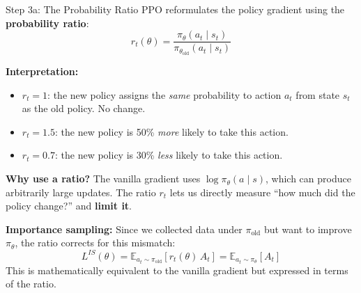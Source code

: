 \documentclass[aspectratio=169,11pt]{beamer}
\begin{document}
\begin{frame}{Step 3a: The Probability Ratio}
  \small
  PPO reformulates the policy gradient using the \textbf{probability ratio}:
  \[
    r_t(\theta) = \frac{\pi_\theta(a_t \mid s_t)}{\pi_{\theta_\text{old}}(a_t \mid s_t)}
  \]

  \textbf{Interpretation:}
  \begin{itemize}\setlength\itemsep{2pt}
    \item $r_t = 1$: the new policy assigns the \emph{same} probability to action $a_t$
      from state $s_t$ as the old policy. No change.
    \item $r_t = 1.5$: the new policy is 50\% \emph{more} likely to take this action.
    \item $r_t = 0.7$: the new policy is 30\% \emph{less} likely to take this action.
  \end{itemize}

  \medskip
  \textbf{Why use a ratio?}  The vanilla gradient uses $\log \pi_\theta(a \mid s)$,
  which can produce arbitrarily large updates.  The ratio $r_t$ lets us directly
  measure ``how much did the policy change?'' and \textbf{limit it}.

  \medskip
  \textbf{Importance sampling:} Since we collected data under $\pi_\text{old}$ but want
  to improve $\pi_\theta$, the ratio corrects for this mismatch:
  \[
    L^{IS}(\theta) = \mathbb{E}_{a_t \sim \pi_\text{old}}\!\left[
      r_t(\theta)\, A_t
    \right]
    = \mathbb{E}_{a_t \sim \pi_\theta}\!\left[ A_t \right]
  \]
  This is mathematically equivalent to the vanilla gradient but expressed in terms of the ratio.
\end{frame}
\end{document}
